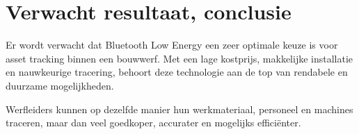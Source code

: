 %
%
%
%
%

\section{Verwacht resultaat, conclusie}%
\label{sec:verwachte_resultaten}

Er wordt verwacht dat Bluetooth Low Energy een zeer optimale keuze is voor asset tracking binnen een bouwwerf. Met een lage kostprijs, makkelijke installatie en nauwkeurige tracering, behoort deze technologie aan de top van rendabele en duurzame mogelijkheden.

Werfleiders kunnen op dezelfde manier hun werkmateriaal, personeel en machines traceren, maar dan veel goedkoper, accurater en mogelijks efficiënter.

%
%

